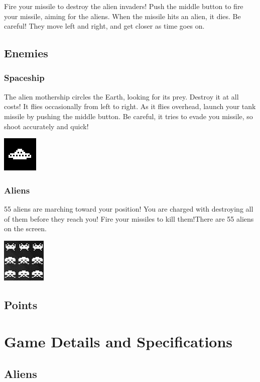 \documentclass[11pt,letter,oneside]{report}
\begin{document}
Fire your missile to destroy the alien invaders! Push the middle button to fire your missile, aiming for the aliens. When the missile hits an alien, it dies. Be careful! They move left and right, and get closer as time goes on.

\subsection{Enemies}

\subsubsection{Spaceship}

The alien mothership circles the Earth, looking for its prey. Destroy it at all costs! It flies occasionally from left to right. As it flies overhead, launch your tank missile by pushing the middle button. Be careful, it tries to evade you missile, so shoot accurately and quick!

\includegraphics[]{big-alien.png}

\subsubsection{Aliens}
55 aliens are marching toward your position! You are charged with destroying all of them before they reach you! Fire your missiles to kill them!There are 55 aliens on the screen.

\includegraphics[]{aliens.jpg}

\subsection{Points}

\section{Game Details and Specifications}

\subsection{Aliens}
\end{document}
